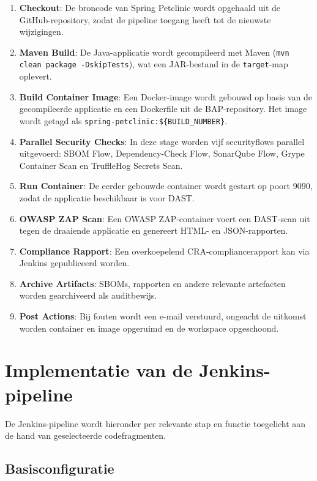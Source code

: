 \begin{enumerate}
    \item \textbf{Checkout}: De broncode van Spring Petclinic wordt opgehaald uit de GitHub-repository, zodat de pipeline toegang heeft tot de nieuwste wijzigingen.
    \item \textbf{Maven Build}: De Java-applicatie wordt gecompileerd met Maven (\texttt{mvn clean package -DskipTests}), wat een JAR-bestand in de \texttt{target}-map oplevert.
    \item \textbf{Build Container Image}: Een Docker-image wordt gebouwd op basis van de gecompileerde applicatie en een Dockerfile uit de BAP-repository. Het image wordt getagd als \texttt{spring-petclinic:\$\{BUILD\_NUMBER\}}.
    \item \textbf{Parallel Security Checks}: In deze stage worden vijf securityflows parallel uitgevoerd: SBOM Flow, Dependency-Check Flow, SonarQube Flow, Grype Container Scan en TruffleHog Secrets Scan.
    \item \textbf{Run Container}: De eerder gebouwde container wordt gestart op poort 9090, zodat de applicatie beschikbaar is voor DAST.
    \item \textbf{OWASP ZAP Scan}: Een OWASP ZAP-container voert een DAST-scan uit tegen de draaiende applicatie en genereert HTML- en JSON-rapporten.
    \item \textbf{Compliance Rapport}: Een overkoepelend CRA-compliancerapport kan via Jenkins gepubliceerd worden.
    \item \textbf{Archive Artifacts}: SBOMs, rapporten en andere relevante artefacten worden gearchiveerd als auditbewijs.
    \item \textbf{Post Actions}: Bij fouten wordt een e-mail verstuurd, ongeacht de uitkomst worden container en image opgeruimd en de workspace opgeschoond.
\end{enumerate}

\section{Implementatie van de Jenkins-pipeline}

De Jenkins-pipeline wordt hieronder per relevante stap en functie toegelicht aan de hand van geselecteerde codefragmenten.

\subsection{Basisconfiguratie}

